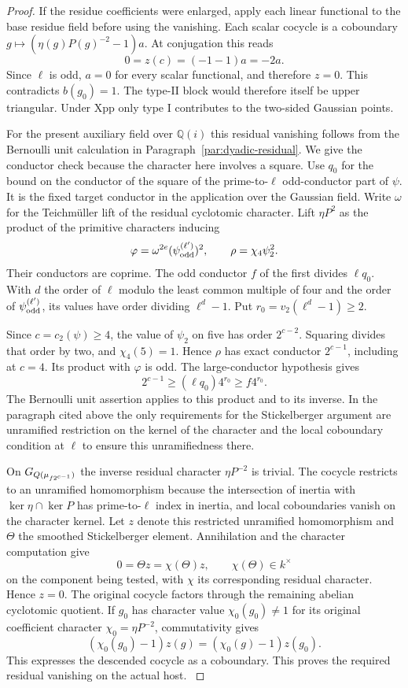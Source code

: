 \begin{proof}
If the residue coefficients
were enlarged, apply each linear functional to the base
residue field before using the vanishing. Each scalar cocycle is a coboundary \(g\mapsto(\eta(g)P(g)^{-2}-1)a\). At conjugation this reads
\[
 0=z(c)=(-1-1)a=-2a .
\]
Since \(\ell\) is odd, \(a=0\) for every scalar functional, and therefore \(z=0\). This
contradicts \(b(g_0)=1\). The type-II block would therefore
itself be upper triangular. Under \(\mathrm{Xpp}\) only
type I contributes to the two-sided Gaussian points.

For the present auxiliary field over \(\mathbb Q(i)\) this residual vanishing follows
from the Bernoulli unit calculation in
Paragraph~\ref{par:dyadic-residual}. We give the conductor
check because the character here involves a square.
Use \(q_0\) for the bound on the conductor of the square
of the prime-to-\(\ell\) odd-conductor part of \(\psi\).
It is the fixed target conductor in the application over the Gaussian field.
Write \(\omega\) for the Teichmüller lift of the residual
cyclotomic character. Lift \(\eta P^2\) as the product of
the primitive characters inducing
\[
 \varphi=\omega^{2e}(\psi_{\rm odd}^{(\ell')})^2,
       \qquad \rho=\chi_4\psi_2^2 .
\]
Their conductors are coprime. The odd conductor \(f\) of
the first divides \(\ell q_0\). With \(d\) the order of
\(\ell\) modulo the least common multiple of four and
the order of \(\psi_{\rm odd}^{(\ell')}\), its values have
order dividing \(\ell^d-1\). Put \(r_0=v_2(\ell^d-1)\ge2\).

Since \(c=c_2(\psi)\ge4\), the value of \(\psi_2\) on
five has order \(2^{c-2}\). Squaring divides that order
by two, and \(\chi_4(5)=1\). Hence \(\rho\) has exact
conductor \(2^{c-1}\), including at \(c=4\).
Its product with \(\varphi\) is odd. The large-conductor
hypothesis gives
\[
        2^{c-1}\ge (\ell q_0)4^{r_0}\ge f4^{r_0}.
\]
The Bernoulli unit assertion applies to this product and to
its inverse. In the paragraph cited above the only
requirements for the Stickelberger argument are
unramified restriction on the kernel of the character
and the local coboundary condition at \(\ell\) to
ensure this unramifiedness there.

On
\(G_{Q(\mu_{f2^{c-1}})}\) the inverse residual character
\(\eta P^{-2}\) is trivial. The cocycle restricts to an
unramified homomorphism because the intersection of inertia
with \(\ker\eta\cap\ker P\) has prime-to-\(\ell\) index
in inertia, and local coboundaries vanish on the character
kernel. Let \(z\) denote this restricted unramified homomorphism
and \(\Theta\) the smoothed Stickelberger element. Annihilation
and the character computation give
\[
           0=\Theta z=\chi(\Theta)z,\qquad \chi(\Theta)\in k^\times
\]
on the component being tested, with \(\chi\) its corresponding
residual character. Hence \(z=0\). The original cocycle factors
through the remaining abelian cyclotomic quotient. If \(g_0\)
has character value \(\chi_0(g_0)\ne1\) for its original
coefficient character \(\chi_0=\eta P^{-2}\), commutativity
gives
\[
   (\chi_0(g_0)-1)z(g)=(\chi_0(g)-1)z(g_0).
\]
This expresses the descended cocycle as a coboundary. This proves the required residual vanishing
on the actual host.
\hfill\mbox{\cite{washington-nonp,washington-cyclo}}


\end{proof}
